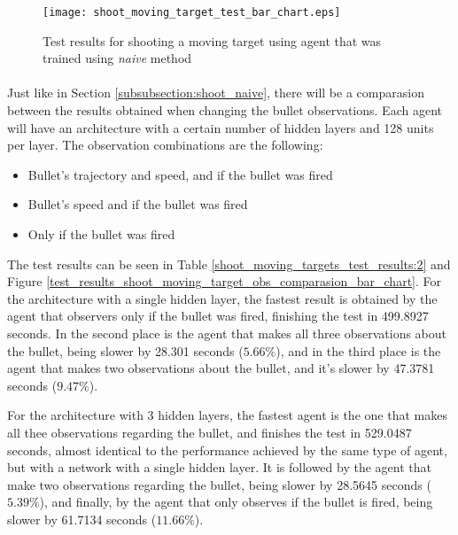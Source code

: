 \begin{figure}
    \begin{center}
        \texttt{[image: shoot\_moving\_target\_test\_bar\_chart.eps]}
        \caption{Test results for shooting a moving target using agent that was trained using \emph{naive} method}
        \label{test_results_shoot_moving_target_bar_chart}
    \end{center}
\end{figure}



\paragraph{}
Just like in Section \ref{subsubsection:shoot_naive}, there will be a comparasion between the results obtained when changing the bullet observations. Each agent will have an architecture with a certain number of hidden layers and 128 units per layer. The observation combinations are the following:
\begin{itemize}
    \item Bullet's trajectory and speed, and if the bullet was fired
    \item Bullet's speed and if the bullet was fired
    \item Only if the bullet was fired
\end{itemize}

The test results can be seen in Table \ref{shoot_moving_targets_test_results:2} and Figure \ref{test_results_shoot_moving_target_obs_comparasion_bar_chart}. For the architecture with a single hidden layer, the fastest result is obtained by the agent that observers only if the bullet was fired, finishing the test in 499.8927 seconds. In the second place is the agent that makes all three observations about the bullet, being slower by 28.301 seconds ($5.66\%$), and in the third place is the agent that makes two observations about the bullet, and it's slower by 47.3781 seconds ($9.47\%$).

For the architecture with 3 hidden layers, the fastest agent is the one that makes all thee observations regarding the bullet, and finishes the test in 529.0487 seconds, almost identical to the performance achieved by the same type of agent, but with a network with a single hidden layer. It is followed by the agent that make two observations regarding the bullet, being slower by 28.5645 seconds ($5.39\%$), and finally, by the agent that only observes if the bullet is fired, being slower by 61.7134 seconds ($11.66\%$).

